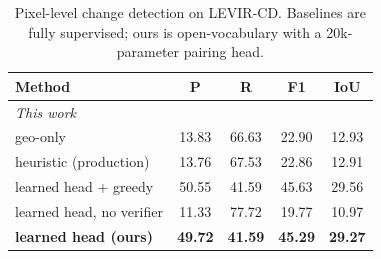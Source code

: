 \begin{table}[t]
\centering
\caption{Pixel-level change detection on LEVIR-CD. Baselines are fully supervised; ours is open-vocabulary with a 20k-parameter pairing head.}
\label{tab:levir_cd_pixel}
\setlength{\tabcolsep}{4pt}
\begin{tabular}{lcccc}
\toprule
Method & P & R & F1 & IoU \\
\midrule
\midrule
\multicolumn{5}{l}{\emph{This work}} \\
geo-only & 13.83 & 66.63 & 22.90 & 12.93 \\
heuristic (production) & 13.76 & 67.53 & 22.86 & 12.91 \\
learned head + greedy & 50.55 & 41.59 & 45.63 & 29.56 \\
learned head, no verifier & 11.33 & 77.72 & 19.77 & 10.97 \\
\textbf{learned head (ours)} & \textbf{49.72} & \textbf{41.59} & \textbf{45.29} & \textbf{29.27} \\
\bottomrule
\end{tabular}
\end{table}

